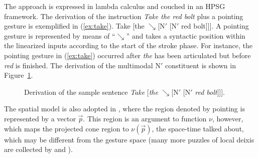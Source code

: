 \documentclass[output=paper,biblatex,babelshorthands,newtxmath,draftmode,colorlinks,citecolor=brown]{langscibook}
\begin{document}
The approach is expressed in lambda calculus and couched in an HPSG framework.
%
The derivation of the instruction \textit{Take the red bolt} plus a pointing gesture is exemplified in (\ref{ex:take}).
%
\ea \label{ex:take}
Take [the $\searrow$[N$'$ [N$'$ red bolt]]].
\z 
%
A pointing gesture is represented by means of \enquote{$\searrow$} and takes a syntactic position within the linearized inputs according to the start of the stroke phase. 
%
For instance, the pointing gesture in (\ref{ex:take}) occurred after \textit{the} has been articulated but before \textit{red} is finished.
%
The derivation of the multimodal N$'$ constituent is shown in Figure~\ref{fig:take-tree}.

\begin{figure}
\caption{Derivation of the sample sentence \textit{Take} [\textit{the} $\searrow$[N$'$ [N$'$ \textit{red bolt}]]].}
\label{fig:take-tree}
\end{figure}


The spatial model is also adopted in \citet{Lascarides:Stone:2009:a}, where the region denoted by pointing is represented by a vector $\vec{p}$.
%
This region is an argument to function $\nu$, however, which maps the projected cone region to $\nu(\vec{p})$, the space-time talked about, which may be different from the gesture space (many more puzzles of local deixis are collected by \citealp{Klein:1978} and \citealp{Fricke:2007:a}).
\end{document}
